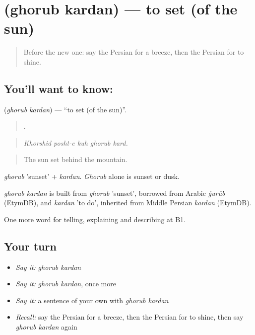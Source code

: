 \section[\texorpdfstring{\fa{غروب} \fa{کردن} (ghorub kardan)}{غروب کردن (ghorub kardan)}]{  (ghorub kardan) — to set (of the sun)}

\label{lesson:FA-C479-ghorub-kardan}



\begin{quote}
Before the new one: say the Persian for a breeze, then the Persian for to shine.
\end{quote}

\subsection*{You'll want to know:  }
\textbf{ } (\emph{ghorub kardan}) — \textquotedblleft{}to set (of the sun)\textquotedblright{}.

\begin{quote}
    .
\end{quote}

\begin{quote}
\emph{Khorshid posht-e kuh ghorub kard.}
\end{quote}

\begin{quote}
The sun set behind the mountain.
\end{quote}

\emph{ghorub} 'sunset' + \emph{kardan}. \emph{Ghorub} alone is sunset or dusk.

\begin{cousinweb}
\emph{ghorub kardan} is built from \emph{ghorub} 'sunset', borrowed from Arabic \emph{ġurūb} (EtymDB), and \emph{kardan} 'to do', inherited from Middle Persian \emph{kardan} (EtymDB).
\end{cousinweb}

\begin{grammarlens}[title={What you've built}]
One more word for telling, explaining and describing at B1.
\end{grammarlens}

\subsection*{Your turn}
\begin{itemize}
\raggedright
  \item \emph{Say it:} \emph{ghorub kardan}
  \item \emph{Say it:} \emph{ghorub kardan}, once more
  \item \emph{Say it:} a sentence of your own with \emph{ghorub kardan}
  \item \emph{Recall:} say the Persian for a breeze, then the Persian for to shine, then say \emph{ghorub kardan} again
\end{itemize}


